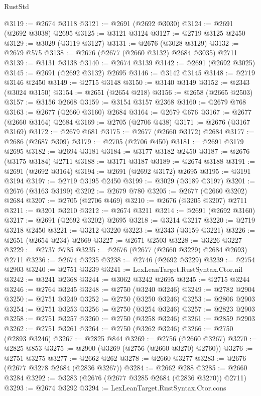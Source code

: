 \begin{lexlean}{RustStd}
\begin{coremodule}
@3119 := @2674 @3118
@3121 := @2691 (@2692 @3030)
@3124 := @2691 (@2692 @3038) @2695
@3125 := @3121 @3124
@3127 := @2719 @3125 @2450
@3129 := @3029 (@3119 @3127)
@3131 := @2676 (@3028 @3129)
@3132 := @2679 @575
@3138 := @2676 (@2677 (@2660 @3132) @2684 @3035) @2711
@3139 := @3131 @3138
@3140 := @2674 @3139
@3142 := @2691 (@2692 @3025)
@3145 := @2691 (@2692 @3132) @2695
@3146 := @3142 @3145
@3148 := @2719 @3146 @2450
@3149 := @2715 @3148
@3150 := @3140 @3149
@3152 := @2343 (@3024 @3150)
@3154 := @2651 (@2654 @218)
@3156 := @2658 (@2665 @2503)
@3157 := @3156 @2668
@3159 := @3154 @3157 @2368
@3160 := @2679 @768
@3163 := @2677 (@2660 @3160) @2684
@3164 := @2679 @676
@3167 := @2677 (@2660 @3164) @2684
@3169 := @2705 (@2706 @438)
@3171 := @2676 (@3167 @3169)
@3172 := @2679 @681
@3175 := @2677 (@2660 @3172) @2684
@3177 := @2686 (@2687 @309)
@3179 := @2705 (@2706 @450)
@3181 := @2691 @3179 @2695
@3182 := @2694 @3181
@3184 := @3177 @3182 @2450
@3187 := @2676 (@3175 @3184) @2711
@3188 := @3171 @3187
@3189 := @2674 @3188
@3191 := @2691 (@2692 @3164)
@3194 := @2691 (@2692 @3172) @2695
@3195 := @3191 @3194
@3197 := @2719 @3195 @2450
@3199 := @3029 (@3189 @3197)
@3201 := @2676 (@3163 @3199)
@3202 := @2679 @780
@3205 := @2677 (@2660 @3202) @2684
@3207 := @2705 (@2706 @469)
@3210 := @2676 (@3205 @3207) @2711
@3211 := @3201 @3210
@3212 := @2674 @3211
@3214 := @2691 (@2692 @3160)
@3217 := @2691 (@2692 @3202) @2695
@3218 := @3214 @3217
@3220 := @2719 @3218 @2450
@3221 := @3212 @3220
@3223 := @2343 (@3159 @3221)
@3226 := @2651 (@2654 @234) @2669
@3227 := @2671 @2503
@3228 := @3226 @3227
@3229 := @2737 @785
@3235 := @2676 (@2677 (@2660 @3229) @2684 @2693) @2711
@3236 := @2674 @3235
@3238 := @2746 (@2692 @3229)
@3239 := @2754 @2903
@3240 := @2751 @3239
@3241 := LexLeanTarget.RustSyntax.Ctor.nil
@3242 := @3241 @2368
@3244 := @3062 @3242 @2695
@3245 := @2715 @3244
@3246 := @2764 @3245
@3248 := @2750 (@3240 @3246)
@3249 := @2782 @2904
@3250 := @2751 @3249
@3252 := @2750 (@3250 @3246)
@3253 := @2806 @2903
@3254 := @2751 @3253
@3256 := @2750 (@3254 @3246)
@3257 := @2823 @2903
@3258 := @2751 @3257
@3260 := @2750 (@3258 @3246)
@3261 := @2859 @2903
@3262 := @2751 @3261
@3264 := @2750 (@3262 @3246)
@3266 := @2750 (@2893 @3246)
@3267 := @2825 @844
@3269 := @2756 (@2660 @3267)
@3270 := @2825 @853
@3275 := @2900 (@3269 (@2756 (@2660 @3270) @2760))
@3276 := @2751 @3275
@3277 := @2662 @262
@3278 := @2660 @3277
@3283 := @2676 (@2677 @3278 @2684 (@2836 @3267))
@3284 := @2662 @288
@3285 := @2660 @3284
@3292 := @3283 (@2676 (@2677 @3285 @2684 (@2836 @3270)) @2711)
@3293 := @2674 @3292
@3294 := LexLeanTarget.RustSyntax.Ctor.cons

\end{coremodule}
\end{lexlean}
